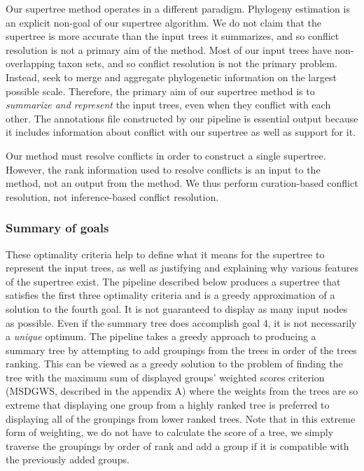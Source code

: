 \documentclass[fleqn,12pt,lineno,english]{wlpeerj}
\begin{document}
Our supertree method operates in a different paradigm.  Phylogeny estimation is an explicit non-goal of our supertree algorithm.  We do not claim that the supertree is more accurate than the input trees it summarizes, and so conflict resolution is not a primary aim of the method. Most of our input trees have non-overlapping taxon sets, and so conflict resolution is not the primary problem.  Instead, seek to merge and aggregate phylogenetic information on the largest possible scale.  Therefore, the primary aim of our supertree method is to \emph{summarize and represent} the input trees, even when they conflict with each other.  The annotations file constructed by our pipeline is essential output because it includes information about conflict with our supertree as well as support for it.

Our method must resolve conflicts in order to construct a single supertree.  However, the rank information used to resolve conflicts is an input to the method, not an output from the method.  We thus perform curation-based conflict resolution, not inference-based conflict resolution.

\subsubsection{Summary of goals}

These optimality criteria help to define what it means for the supertree
to represent the input trees, as well as justifying and explaining
why various features of the supertree exist. The pipeline described
below produces a supertree that satisfies the first three optimality
criteria and is a greedy approximation of a solution to the fourth
goal. It is not guaranteed to display as many input nodes as possible.
Even if the summary tree does accomplish goal 4, it is not necessarily
a \emph{unique} optimum. The pipeline takes a greedy approach to producing
a summary tree by attempting to add groupings from the trees in order
of the trees ranking. This can be viewed as a greedy solution to the
problem of finding the tree with the maximum sum of displayed groups'
weighted scores criterion (MSDGWS, described in the appendix A) where the
weights from the trees are so extreme that displaying one group from
a highly ranked tree is preferred to displaying all of the groupings
from lower ranked trees.
Note that in this extreme form of weighting, we do not have to calculate
the score of a tree, we simply traverse the groupings by order of rank
and add a group if it is compatible with the previously added groups.
\end{document}
